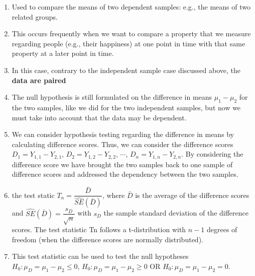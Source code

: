 \begin{enumerate}
    \item Used to compare the means of two dependent samples: e.g., the means of two related groups.
    \hfill \cite{statistics/book/Statistics-for-Data-Scientists/Maurits-Kaptein}

    \item This occurs frequently when we want to compare a property that we measure regarding people (e.g., their happiness) at one point in time with that same property at a later point in time.
    \hfill \cite{statistics/book/Statistics-for-Data-Scientists/Maurits-Kaptein}

    \item  In this case, contrary to the independent sample case discussed above, the \textbf{data are paired}
    \hfill \cite{statistics/book/Statistics-for-Data-Scientists/Maurits-Kaptein}

    \item The null hypothesis is still formulated on the difference in means $\mu_1 - \mu_2$ for the two samples, like we did for the two independent samples, but now we must take into account that the data may be dependent.
    \hfill \cite{statistics/book/Statistics-for-Data-Scientists/Maurits-Kaptein}

    \item We can consider hypothesis testing regarding the difference in means by calculating difference scores. 
    Thus, we can consider the difference scores $D_1 = Y_{1,1} - Y_{2,1}$, $D_2 = Y_{1,2} - Y_{2,2}$, $\cdots$, $D _n = Y_{1,n} - Y_{2,n} $. 
    By considering the difference score we have brought the two samples back to one sample of difference scores and addressed the dependency between the two samples.
    \hfill \cite{statistics/book/Statistics-for-Data-Scientists/Maurits-Kaptein}

    \item the test static $T_n = \dfrac{\bar{D}}{\hat{S E}(\bar{D})}$, where $\bar{D}$ is the average of the difference scores and $\hat{S E}(\bar{D}) = \dfrac{s_ D}{\sqrt{n}}$ with $s _D$ the sample standard deviation of the difference scores.
    The test statistic Tn follows a t-distribution with $n - 1$ degrees of freedom (when the difference scores are normally distributed).
    \hfill \cite{statistics/book/Statistics-for-Data-Scientists/Maurits-Kaptein}

    \item This test statistic can be used to test the null hypotheses 
    $H_0 : \mu_D = \mu_1 - \mu_2 \leq 0$, 
    $H_0 : \mu_D = \mu_1 - \mu_2 \geq 0$ OR
    $H_0 : \mu_D = \mu_1 - \mu_2 = 0$.
    \hfill \cite{statistics/book/Statistics-for-Data-Scientists/Maurits-Kaptein}

\end{enumerate}



